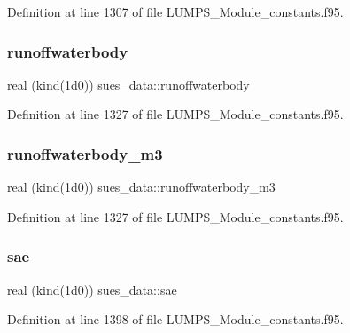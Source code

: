 Definition at line 1307 of file L\+U\+M\+P\+S\+\_\+\+Module\+\_\+constants.\+f95.

\mbox{\label{namespacesues__data_a0fce415bc7210db0cfe37ded2d8c1ef5}} 
\subsubsection{\texorpdfstring{runoffwaterbody}{runoffwaterbody}}
{\footnotesize\ttfamily real (kind(1d0)) sues\+\_\+data\+::runoffwaterbody}



Definition at line 1327 of file L\+U\+M\+P\+S\+\_\+\+Module\+\_\+constants.\+f95.

\mbox{\label{namespacesues__data_abc5b5ae18f30abb3a858e2e24e1e99d7}} 
\subsubsection{\texorpdfstring{runoffwaterbody\+\_\+m3}{runoffwaterbody\_m3}}
{\footnotesize\ttfamily real (kind(1d0)) sues\+\_\+data\+::runoffwaterbody\+\_\+m3}



Definition at line 1327 of file L\+U\+M\+P\+S\+\_\+\+Module\+\_\+constants.\+f95.

\mbox{\label{namespacesues__data_ade8fa0a70d4bdc01712ae9438602f21e}} 
\subsubsection{\texorpdfstring{sae}{sae}}
{\footnotesize\ttfamily real (kind(1d0)) sues\+\_\+data\+::sae}



Definition at line 1398 of file L\+U\+M\+P\+S\+\_\+\+Module\+\_\+constants.\+f95.

\mbox{\label{namespacesues__data_a435acd94af1e3a271f4ee348ac811ad4}} 

